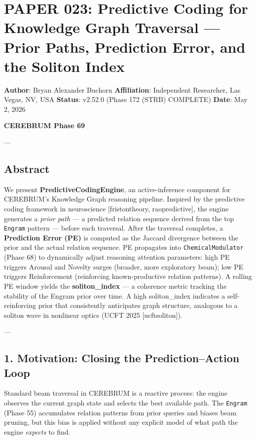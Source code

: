 \section{PAPER 023: Predictive Coding for Knowledge Graph Traversal — Prior Paths, Prediction Error, and the Soliton Index}

\textbf{Author}: Bryan Alexander Buchorn  
\textbf{Affiliation}: Independent Researcher, Las Vegas, NV, USA  
\textbf{Status}: v2.52.0 (Phase 172 (STRB) COMPLETE)
\textbf{Date}: May 2, 2026

\textbf{CEREBRUM Phase 69}

---

\subsection{Abstract}

We present \textbf{PredictiveCodingEngine}, an active-inference component for CEREBRUM's Knowledge Graph reasoning pipeline. Inspired by the predictive coding framework in neuro\-science [friston\-theory, rao\-predi\-ctive], the engine generates a \textit{prior path} — a predicted relation sequence derived from the top \texttt{Engram} pattern — before each traversal. After the traversal completes, a \textbf{Prediction Error (PE)} is computed as the Jaccard divergence between the prior and the actual relation sequence. PE propagates into \texttt{ChemicalModulator} (Phase 68) to dynamically adjust reasoning attention parameters: high PE triggers Arousal and Novelty surges (broader, more exploratory beam); low PE triggers Reinfo\-rcement (reinforcing known-productive relation patterns). A rolling PE window yields the \textbf{soliton\_index} — a coherence metric tracking the stability of the Engram prior over time. A high soliton\_index indicates a self-reinforcing prior that consi\-stently anticipates graph structure, analogous to a soliton wave in nonlinear optics (UCFT 2025 [ucft\-soliton]).

---

\subsection{1. Motivation: Closing the Prediction–Action Loop}

Standard beam traversal in CEREBRUM is a reactive process: the engine observes the current graph state and selects the best available path. The \texttt{Engram} (Phase 55) accumulates relation patterns from prior queries and biases beam pruning, but this bias is applied without any explicit model of what path the engine \textit{expects} to find.

